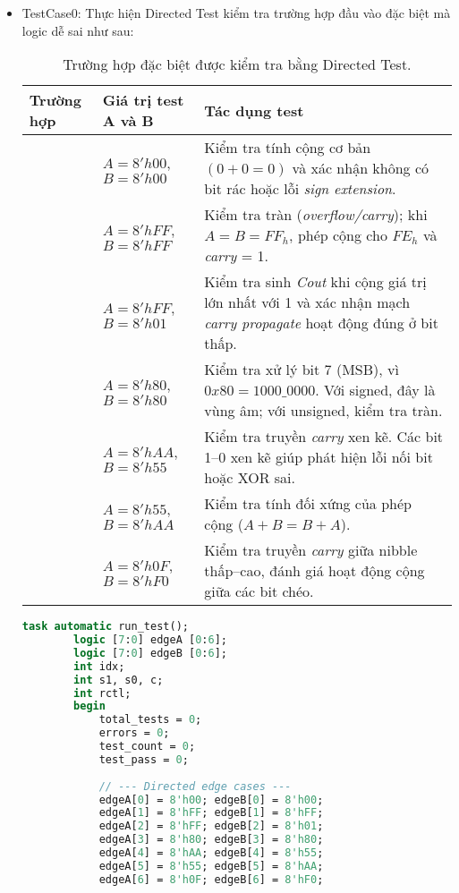 \begin{itemize}[label=-]
	\item TestCase0: Thực hiện Directed Test kiểm tra trường hợp đầu vào đặc biệt mà logic dễ sai như sau:
	
	\begin{table}[H]
		\centering
		\begin{tabular}{|>{\centering\arraybackslash}m{1cm}
				|>{\centering\arraybackslash}m{3.5cm}
				|>{\arraybackslash}m{8.5cm}|}
			\hline
			\textbf{Trường hợp} & \textbf{Giá trị test A và B} & \textbf{Tác dụng test} \\ \hline
			1 & $A = 8'h00$, $B = 8'h00$ & Kiểm tra tính cộng cơ bản $(0 + 0 = 0)$ và xác nhận không có bit rác hoặc lỗi \textit{sign extension}. \\ \hline
			2 & $A = 8'hFF$, $B = 8'hFF$ & Kiểm tra tràn (\textit{overflow/carry}); khi $A = B = FF_h$, phép cộng cho $FE_h$ và \textit{carry} = 1. \\ \hline
			3 & $A = 8'hFF$, $B = 8'h01$ & Kiểm tra sinh \textit{Cout} khi cộng giá trị lớn nhất với 1 và xác nhận mạch \textit{carry propagate} hoạt động đúng ở bit thấp. \\ \hline
			4 & $A = 8'h80$, $B = 8'h80$ & Kiểm tra xử lý bit 7 (MSB), vì $0x80 = 1000\_0000$. Với signed, đây là vùng âm; với unsigned, kiểm tra tràn. \\ \hline
			5 & $A = 8'hAA$, $B = 8'h55$ & Kiểm tra truyền \textit{carry} xen kẽ. Các bit 1–0 xen kẽ giúp phát hiện lỗi nối bit hoặc XOR sai. \\ \hline
			6 & $A = 8'h55$, $B = 8'hAA$ & Kiểm tra tính đối xứng của phép cộng ($A + B = B + A$). \\ \hline
			7 & $A = 8'h0F$, $B = 8'hF0$ & Kiểm tra truyền \textit{carry} giữa nibble thấp–cao, đánh giá hoạt động cộng giữa các bit chéo. \\ \hline
		\end{tabular}
		\caption{Trường hợp đặc biệt được kiểm tra bằng Directed Test.}
	\end{table}
	
	\begin{lstlisting}[style=StyleCode, language=SystemVerilog, caption={Thực hiện Directed Test.}]
		task automatic run_test();
		logic [7:0] edgeA [0:6];
		logic [7:0] edgeB [0:6];
		int idx;
		int s1, s0, c;
		int rctl;
		begin
			total_tests = 0;
			errors = 0;
			test_count = 0;
			test_pass = 0;
			
			// --- Directed edge cases ---
			edgeA[0] = 8'h00; edgeB[0] = 8'h00;
			edgeA[1] = 8'hFF; edgeB[1] = 8'hFF;
			edgeA[2] = 8'hFF; edgeB[2] = 8'h01;
			edgeA[3] = 8'h80; edgeB[3] = 8'h80;
			edgeA[4] = 8'hAA; edgeB[4] = 8'h55;
			edgeA[5] = 8'h55; edgeB[5] = 8'hAA;
			edgeA[6] = 8'h0F; edgeB[6] = 8'hF0;
			

\end{lstlisting}
\end{itemize}
